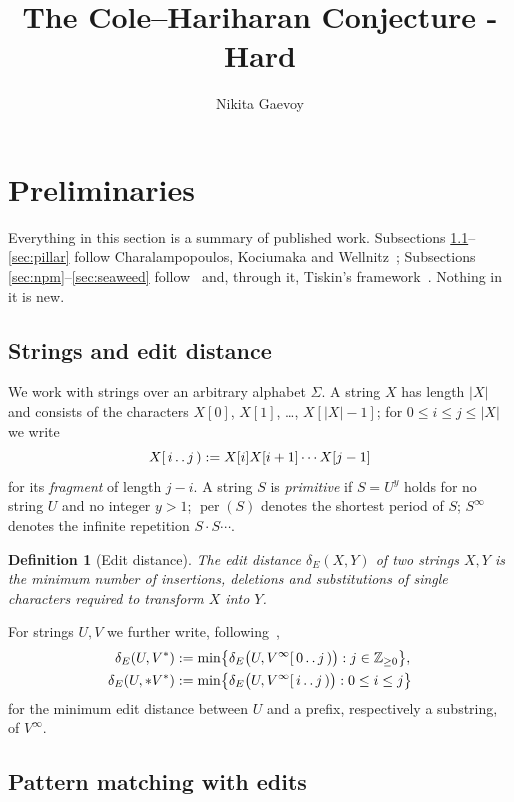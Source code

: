 \documentclass[10pt]{article}
\title{The Cole--Hariharan Conjecture - Hard}
\author{Nikita Gaevoy}
\date{}
\newtheorem{definition}{Definition}
\newcommand{\dE}{\delta_E}
\newcommand{\per}{\operatorname{per}}
\begin{document}
\maketitle

\section{Preliminaries}

Everything in this section is a summary of published work. Subsections
\ref{sec:strings}--\ref{sec:pillar} follow Charalampopoulos, Kociumaka and
Wellnitz~\cite{CKW20,CKW22}; Subsections
\ref{sec:npm}--\ref{sec:seaweed} follow~\cite{CKW22} and, through it,
Tiskin's framework~\cite{Tiskin08,Tiskin15,TiskinArXiv}. Nothing in it is new.

\subsection{Strings and edit distance}\label{sec:strings}

We work with strings over an arbitrary alphabet $\Sigma$. A string $X$ has
length $|X|$ and consists of the characters $X[0]$, $X[1]$, \ldots,
$X[|X|-1]$; for $0\le i\le j\le|X|$ we write
\[
X[\,i\mathinner{.\,.}j\,) := X[i]X[i+1]\cdots X[j-1]
\]
for its \emph{fragment} of length $j-i$. A string $S$ is \emph{primitive} if
$S=U^y$ holds for no string $U$ and no integer $y>1$; $\per(S)$ denotes the
shortest period of $S$; $S^\infty$ denotes the infinite repetition
$S\cdot S\cdots$.

\begin{definition}[Edit distance]
The \emph{edit distance} $\dE(X,Y)$ of two strings $X,Y$ is the minimum number
of insertions, deletions and substitutions of single characters required to
transform $X$ into $Y$.
\end{definition}

For strings $U,V$ we further write, following~\cite[Section 1.3]{CKW22},
\[
\begin{aligned}
\dE(U,V^*)&:=\min\bigl\{\dE\bigl(U,V^\infty[\,0\mathinner{.\,.}j\,)\bigr):j\in\mathbb{Z}_{\ge0}\bigr\},\\
\dE(U,{*}V^*)&:=\min\bigl\{\dE\bigl(U,V^\infty[\,i\mathinner{.\,.}j\,)\bigr):0\le i\le j\bigr\}
\end{aligned}
\]
for the minimum edit distance between $U$ and a prefix, respectively a
substring, of $V^\infty$.

\subsection{Pattern matching with edits}\label{sec:pmwe}
\end{document}
